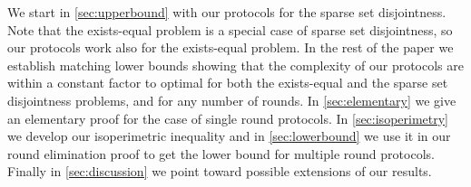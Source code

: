 We start in \autoref{sec:upperbound} with our protocols for the
sparse set disjointness. Note that the exists-equal problem is a
special case of sparse set disjointness, so our protocols work
also for the exists-equal problem. In the rest of the paper we
establish matching lower bounds showing that the complexity of
our protocols are within a constant factor to optimal for both
the exists-equal and the sparse set disjointness problems, and
for any number of rounds. In \autoref{sec:elementary} we give an
elementary proof for the case of single round protocols. In
\autoref{sec:isoperimetry} we develop our isoperimetric
inequality and in \autoref{sec:lowerbound} we use it in our
round elimination proof to get the lower bound for multiple
round protocols. Finally in \autoref{sec:discussion} we point
toward possible extensions of our results.
